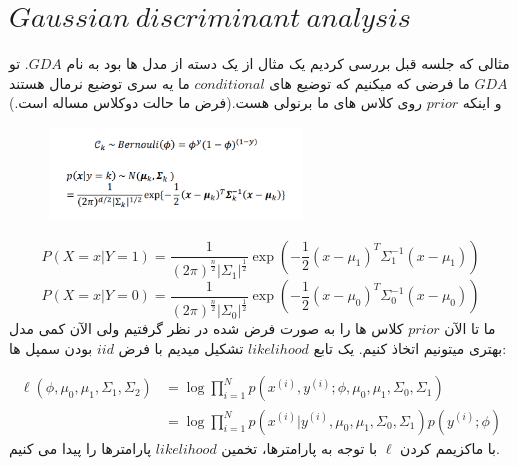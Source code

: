 \documentclass[12pt]{article}
\begin{document}
\fontsize{12pt}{14pt}\selectfont



\section*{$Gaussian\:discriminant\:analysis$}
مثالی که جلسه قبل بررسی کردیم یک مثال از یک دسته از مدل ها بود به نام $GDA$. تو $GDA$ ما فرضی که میکنیم که توضیع های $conditional$ ما یه سری توضیع نرمال هستند و اینکه $prior$ روی کلاس های ما برنولی هست.(فرض ما حالت دوکلاس مساله است.)
\begin{figure}[h]
  \centering
  \includegraphics[width=0.6\textwidth]{figs/1.png}
  \label{1}
\end{figure}

\[ 
P(X=x|Y=1) = \frac{1}{(2\pi)^{\frac{n}{2}}|\Sigma_1|^{\frac{1}{2}}} \exp \left( -\frac{1}{2}(x-\mu_1)^T \Sigma_1^{-1} (x-\mu_1) \right)
\]
\[ 
P(X=x|Y=0) = \frac{1}{(2\pi)^{\frac{n}{2}}|\Sigma_0|^{\frac{1}{2}}} \exp \left( -\frac{1}{2}(x-\mu_0)^T \Sigma_0^{-1} (x-\mu_0) \right)  
\]
ما تا الآن $prior$ کلاس ها را به صورت فرض شده در نظر گرفتیم ولی الآن کمی مدل بهتری میتونیم اتخاذ کنیم. یک تابع $likelihood$ تشکیل میدیم با فرض $iid$ بودن سمپل ها:

\begin{align*}
\ell(\phi, \mu_0, \mu_1, \Sigma_1, \Sigma_2) &= \log \prod_{i=1}^{N} p(x^{(i)}, y^{(i)}; \phi, \mu_0, \mu_1, \Sigma_0, \Sigma_1) \\
&= \log \prod_{i=1}^{N} p(x^{(i)}| y^{(i)}, \mu_0, \mu_1, \Sigma_0, \Sigma_1) p(y^{(i)}; \phi)
\end{align*}
با ماکزیمم کردن $\ell$ با توجه به پارامترها، تخمین $likelihood$ پارامترها را پیدا می کنیم.
\end{document}

